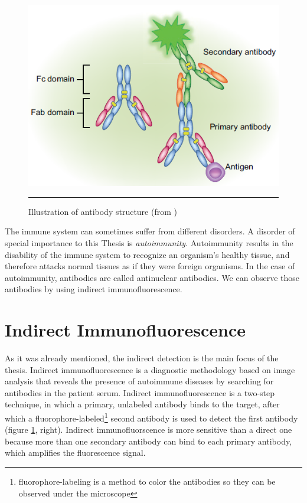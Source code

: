\begin{figure}[htbp]
	\centering
	\includegraphics[scale=0.5]{Figures/Domain/antibodies}
	\rule{35em}{0.5pt}
	\caption[Illustration of antibody structure]{Illustration of antibody structure (from \cite{OdellCook2013})}
	\label{fig:AntibodyIllustration}

\end{figure}

The immune system can sometimes suffer from different disorders. A disorder of special importance to this Thesis is  \textit{autoimmunity}. Autoimmunity results in the disability of the immune system to recognize an organism's healthy tissue, and therefore attacks normal tissues as if they were foreign organisms. In the case of autoimmunity, antibodies are called antinuclear antibodies. We can observe those antibodies by using indirect immunofluorescence. \\

\section{Indirect Immunofluorescence}

As it was already mentioned, the indirect detection is the main focus of the thesis. Indirect immunofluorescence is a diagnostic methodology based on image analysis that reveals the presence of autoimmune diseases by searching for antibodies in the patient serum. Indirect immunofluorescence is a two-step technique, in which a primary, unlabeled antibody binds to the target, after which a fluorophore-labeled\footnote{fluorophore-labeling is a method to color the antibodies so they can be observed under the microscope} second antibody is used to detect the first antibody (figure \ref{fig:AntibodyIllustration}, right). Indirect immunofluorscence is more sensitive than a direct one because more than one secondary antibody can bind to each primary antibody, which amplifies the fluorescence signal. \\

